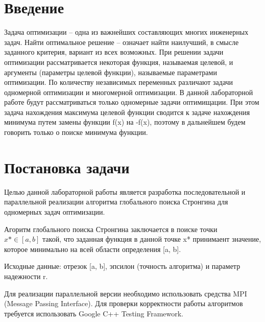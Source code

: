 \documentclass{report}
\begin{document}
\setcounter{page}{2}

\tableofcontents
\newpage

\section*{Введение}
Задача оптимизации – одна из важнейших составляющих многих инженерных задач. Найти оптимальное решение – означает найти наилучший, в смысле заданного критерия, вариант из всех возможных. При решении задачи оптимизации рассматривается некоторая функция, называемая целевой, и аргументы (параметры целевой функции), называемые параметрами оптимизации. По количеству независимых переменных различают задачи одномерной оптимизации и многомерной оптимизации. В данной лабораторной работе будут рассматриваться только одномерные задачи оптимищации. При этом задача нахождения максимума целевой функции сводится к задаче нахождения минимума путем замены функции f(x) на -f(x), поэтому в дальнейшем будем говорить только о поиске минимума функции.
\newpage

\section*{Постановка задачи}
Целью данной лабораторной работы является разработка последовательной и параллельной реализации алгоритма глобального поиска Стронгина для одномерных задач оптимизации.
\par Агоритм глобального поиска Стронгина заключается в поиске точки \\ $x* \in [a, b]$ такой, что заданная функция в данной точке x* принимаент значение, которое минимально на всей области определения [a, b].
\par Исходные данные: отрезок [a, b], эпсилон (точность алгоритма)  и параметр надежности r.
\par Для реализации параллельной версии необходимо использовать средства MPI (Message Passing Interface). Для проверки корректности работы алгоритмов требуется использовать Google C++ Testing Framework.
\newpage

\end{document}
